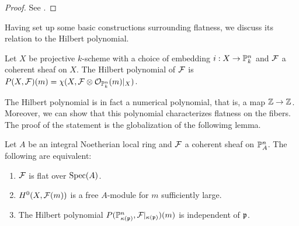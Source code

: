 \begin{proof}
    See \cite[\href{https://stacks.math.columbia.edu/tag/02KH}{Tag 02KH}]{stacks-project}.
\end{proof}
Having set up some basic constructions surrounding flatness, we discuss its relation to the Hilbert polynomial. 
\begin{definition}\label{def: hilbert polynomial}
    Let $X$ be projective $k$-scheme with a choice of embedding $i:X\to\mathbb{P}^{n}_{k}$ and $\mathcal{F}$ a coherent sheaf on $X$. The Hilbert polynomial of $\mathcal{F}$ is $P(X,\mathcal{F})(m)=\chi(X,\mathcal{F}\otimes\mathcal{O}_{\mathbb{P}^{n}_{k}}(m)|_{X})$. 
\end{definition}
The Hilbert polynomial is in fact a numerical polynomial, that is, a map $\mathbb{Z}\to\mathbb{Z}$. Moreover, we can show that this polynomial characterizes flatness on the fibers. The proof of the statement is the globalization of the followimg lemma. 
\begin{lemma}\label{lem: local constant hilbert polynomial}
    Let $A$ be an integral Noetherian local ring and $\mathcal{F}$ a coherent sheaf on $\mathbb{P}^{n}_{A}$. The following are equivalent:
    \begin{enumerate}[label=(\alph*)]
        \item $\mathcal{F}$ is flat over $\operatorname{Spec}(A)$. 
        \item $H^{0}(X,\mathcal{F}(m))$ is a free $A$-module for $m$ sufficiently large. 
        \item The Hilbert polynomial $P(\mathbb{P}^{n}_{\kappa(\mathfrak{p})},\mathcal{F}|_{\kappa(\mathfrak{p})})(m)$ is independent of $\mathfrak{p}$.
    \end{enumerate}
\end{lemma}
